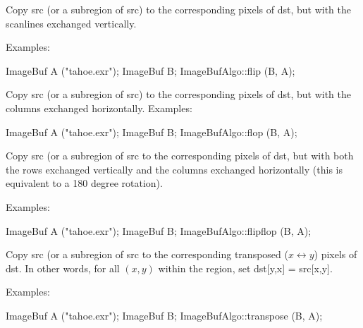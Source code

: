  
Copy {\cf src} (or a subregion of {\cf src}) to the corresponding pixels
of {\cf dst}, but with the scanlines exchanged vertically.

\smallskip
\noindent Examples:
\begin{code}
    ImageBuf A ("tahoe.exr");
    ImageBuf B;
    ImageBufAlgo::flip (B, A);
\end{code}
\apiend


 
Copy {\cf src} (or a subregion of {\cf src}) to the corresponding pixels
of {\cf dst}, but with the columns exchanged horizontally.
\smallskip
\noindent Examples:
\begin{code}
    ImageBuf A ("tahoe.exr");
    ImageBuf B;
    ImageBufAlgo::flop (B, A);
\end{code}
\apiend


 
Copy {\cf src} (or a subregion of {\cf src} to the corresponding pixels
of {\cf dst}, but with both the rows exchanged vertically and the
columns exchanged horizontally (this is equivalent to a 180 degree rotation).

\smallskip
\noindent Examples:
\begin{code}
    ImageBuf A ("tahoe.exr");
    ImageBuf B;
    ImageBufAlgo::flipflop (B, A);
\end{code}
\apiend


 
Copy {\cf src} (or a subregion of {\cf src} to the corresponding 
transposed ($x \leftrightarrow y$) pixels
of {\cf dst}.  In other words, for all $(x,y)$ within the region,
set {\cf dst[y,x] = src[x,y]}.

\smallskip
\noindent Examples:
\begin{code}
    ImageBuf A ("tahoe.exr");
    ImageBuf B;
    ImageBufAlgo::transpose (B, A);
\end{code}
\apiend


